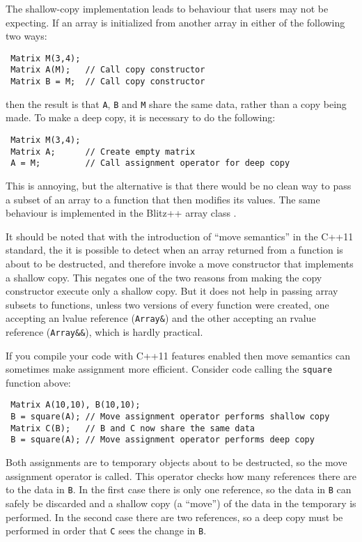 \documentclass[a4,oneside]{book}
\def\codesize{\small}
\def\code#1{{\codesize\texttt{#1}}}
\def\cxx11{\marginpar{\rotatebox[origin=rb]{90}{\textbf{C++11 only~~~}}}}
\begin{document}
The shallow-copy implementation leads to behaviour that users may not
be expecting. If an array is initialized from another array in either
of the following two ways:
\begin{lstlisting}
 Matrix M(3,4);
 Matrix A(M);   // Call copy constructor
 Matrix B = M;  // Call copy constructor
\end{lstlisting}
then the result is that \code{A}, \code{B} and \code{M} share the same
data, rather than a copy being made.  To make a deep copy, it is
necessary to do the following:
\begin{lstlisting}
 Matrix M(3,4);
 Matrix A;      // Create empty matrix
 A = M;         // Call assignment operator for deep copy
\end{lstlisting}
This is annoying, but the alternative is that there would be no clean
way to pass a subset of an array to a function that then modifies its
values. The same behaviour is implemented in the Blitz++ array class
\cite[]{Veldhuizen1995}.

It should be noted that with the introduction of ``move semantics'' in
the C++11 standard, the it is possible to detect when an array
returned from a function is about to be destructed, and therefore
invoke a move constructor that implements a shallow copy. This negates
one of the two reasons from making the copy constructor execute only a
shallow copy.  But it does not help in passing array subsets to
functions, unless two versions of every function were created, one
accepting an lvalue reference (\code{Array\&}) and the other accepting
an rvalue reference (\code{Array\&\&}), which is hardly practical.

\cxx11 \begin{leftbar}If you compile your code with C++11 features
  enabled then move semantics can sometimes make assignment more
  efficient. Consider code calling the \code{square} function above:
\begin{lstlisting}
 Matrix A(10,10), B(10,10);
 B = square(A); // Move assignment operator performs shallow copy
 Matrix C(B);   // B and C now share the same data
 B = square(A); // Move assignment operator performs deep copy
\end{lstlisting}
  Both assignments are to temporary objects about to be destructed, so
  the move assignment operator is called. This operator checks how
  many references there are to the data in \code{B}. In the first case
  there is only one reference, so the data in \code{B} can safely be
  discarded and a shallow copy (a ``move'') of the data in the
  temporary is performed. In the second case there are two references,
  so a deep copy must be performed in order that \code{C} sees the
  change in \code{B}.
\end{leftbar}
\end{document}
